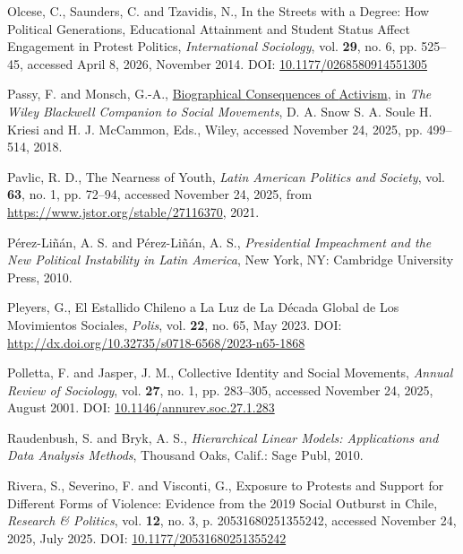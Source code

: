 \documentclass[
  13pt,
]{article}
\newlength{\cslhangindent}
\newenvironment{CSLReferences}[2] %
 {\begin{list}{}{%
  \setlength{\itemindent}{0pt}
  \setlength{\leftmargin}{0pt}
  \setlength{\parsep}{0pt}
  \ifodd #1
   \setlength{\leftmargin}{\cslhangindent}
   \setlength{\itemindent}{-1\cslhangindent}
  \fi
  \setlength{\itemsep}{#2\baselineskip}}}
 {\end{list}}
\begin{document}
\begin{CSLReferences}{1}{0}
Olcese, C., Saunders, C. and Tzavidis, N., In the Streets with a Degree:
{How} Political Generations, Educational Attainment and Student Status
Affect Engagement in Protest Politics, \emph{International Sociology},
vol. \textbf{29}, no. 6, pp. 525--45, accessed April 8, 2026, November
2014. DOI:
\href{https://doi.org/10.1177/0268580914551305}{10.1177/0268580914551305}

Passy, F. and Monsch, G.-A.,
\href{https://doi.org/10.1002/9781119168577.ch28}{Biographical
{Consequences} of {Activism}}, in \emph{The {Wiley Blackwell Companion}
to {Social Movements}}, D. A. Snow S. A. Soule H. Kriesi and H. J.
McCammon, Eds., Wiley, accessed November 24, 2025, pp. 499--514, 2018.

Pavlic, R. D., The {Nearness} of {Youth}, \emph{Latin American Politics
and Society}, vol. \textbf{63}, no. 1, pp. 72--94, accessed November 24,
2025, from \url{https://www.jstor.org/stable/27116370}, 2021.

Pérez-Liñán, A. S. and Pérez-Liñán, A. S., \emph{Presidential
Impeachment and the New Political Instability in {Latin America}}, New
York, NY: Cambridge University Press, 2010.

Pleyers, G., El Estallido Chileno a La Luz de La Década Global de Los
Movimientos Sociales, \emph{Polis}, vol. \textbf{22}, no. 65, May 2023.
DOI: \url{http://dx.doi.org/10.32735/s0718-6568/2023-n65-1868}

Polletta, F. and Jasper, J. M., Collective {Identity} and {Social
Movements}, \emph{Annual Review of Sociology}, vol. \textbf{27}, no. 1,
pp. 283--305, accessed November 24, 2025, August 2001. DOI:
\href{https://doi.org/10.1146/annurev.soc.27.1.283}{10.1146/annurev.soc.27.1.283}

Raudenbush, S. and Bryk, A. S., \emph{Hierarchical Linear Models:
Applications and Data Analysis Methods}, Thousand Oaks, Calif.: Sage
Publ, 2010.

Rivera, S., Severino, F. and Visconti, G., Exposure to Protests and
Support for Different Forms of Violence: {Evidence} from the 2019 Social
Outburst in {Chile}, \emph{Research \& Politics}, vol. \textbf{12}, no.
3, p. 20531680251355242, accessed November 24, 2025, July 2025. DOI:
\href{https://doi.org/10.1177/20531680251355242}{10.1177/20531680251355242}


\end{CSLReferences}
\end{document}
